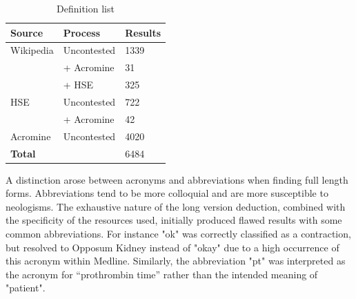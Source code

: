 \begin{table}[]
\setlength{\tabcolsep}{0.7em}
\caption{Definition list}
\label{table:acc_source}
\begin{center}
\begin{tabular}{|lll|}
\hline
\textbf{Source}                          & \textbf{Process}                            & \textbf{Results} \\ \hline
\multicolumn{1}{|l|}{Wikipedia} & \multicolumn{1}{l|}{Uncontested} & 1339    \\
\multicolumn{1}{|l|}{}          & \multicolumn{1}{l|}{+ Acromine\index{Acromine}}    & 31      \\
\multicolumn{1}{|l|}{}          & \multicolumn{1}{l|}{+ HSE}         & 325     \\ \hline
\multicolumn{1}{|l|}{HSE}       & \multicolumn{1}{l|}{Uncontested} & 722     \\
\multicolumn{1}{|l|}{}          & \multicolumn{1}{l|}{+ Acromine\index{Acromine}}    & 42      \\ \hline
\multicolumn{1}{|l|}{Acromine\index{Acromine}}  & \multicolumn{1}{l|}{Uncontested} & 4020    \\ \hline
\textbf{Total}                           &                                    & \multicolumn{1}{|l|}{ 6484}    \\ \hline
\end{tabular}
\end{center}
\end{table}



A distinction arose between acronyms and abbreviations when finding full length forms. Abbreviations tend to be more colloquial and are more susceptible to neologisms. The exhaustive nature of the long version deduction, combined with the specificity of the resources used, initially produced flawed results with some common abbreviations. For instance "ok" was correctly classified as a contraction, but resolved to Opposum Kidney instead of "okay" due to a high occurrence of this acronym within Medline. Similarly, the abbreviation "pt" was interpreted as the acronym for “prothrombin time” rather than the intended meaning of "patient".

